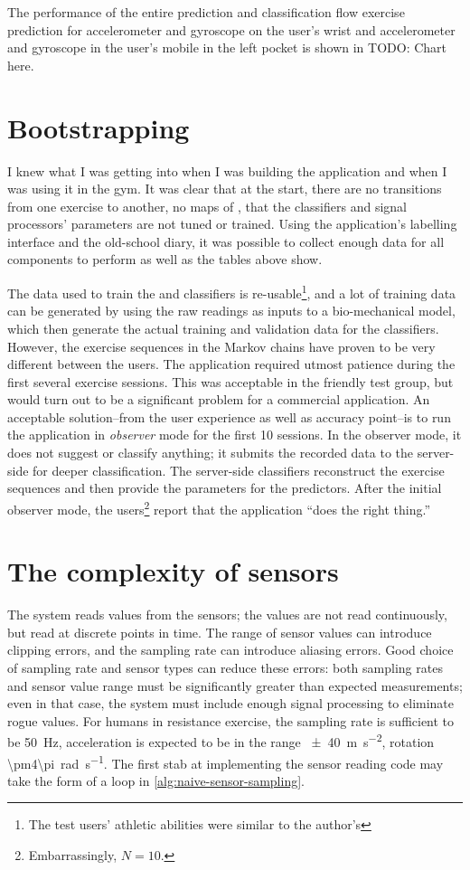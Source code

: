 The performance of the entire prediction and classification flow exercise prediction for accelerometer and gyroscope on the user's wrist and accelerometer and gyroscope in the user's mobile in the left pocket is shown in TODO: Chart here.

\section{Bootstrapping}
I knew what I was getting into when I was building the application and when I was using it in the gym. It was clear that at the start, there are no transitions from one exercise to another, no maps of , that the classifiers and signal processors' parameters are not tuned or trained. Using the application's labelling interface and the old-school diary, it was possible to collect enough data for all components to perform as well as the tables above show. 

The data used to train the  and  classifiers is re-usable\footnote{The test users' athletic abilities were similar to the author's}, and a lot of training data can be generated by using the raw readings as inputs to a bio-mechanical model, which then generate the actual training and validation data for the classifiers. However, the exercise sequences in the Markov chains have proven to be very different between the users. The application required utmost patience during the first several exercise sessions. This was acceptable in the friendly test group, but would turn out to be a significant problem for a commercial application. An acceptable solution--from the user experience as well as accuracy point--is to run the application in \emph{observer} mode for the first 10 sessions. In the observer mode, it does not suggest or classify anything; it submits the recorded data to the server-side for deeper classification. The server-side classifiers reconstruct the exercise sequences and then provide the parameters for the predictors. After the initial observer mode, the users\footnote{Embarrassingly, $N=10$.} report that the application ``does the right thing.''

\section{The complexity of sensors}
The system reads values from the sensors; the values are not read continuously, but read at discrete points in time. The range of sensor values can introduce clipping errors, and the sampling rate can introduce aliasing errors. Good choice of sampling rate and sensor types can reduce these errors: both sampling rates and sensor value range must be significantly greater than expected measurements; even in that case, the system must include enough signal processing to eliminate rogue values. For humans in resistance exercise, the sampling rate is sufficient to be \SI{50}{\hertz}, acceleration is expected to be in the range \SI{\pm40}{\meter\second^{-2}}, rotation \SI{\pm4\pi}{\radian\second^{-1}}. The first stab at implementing the sensor reading code may take the form of a loop in \autoref{alg:naive-sensor-sampling}.

